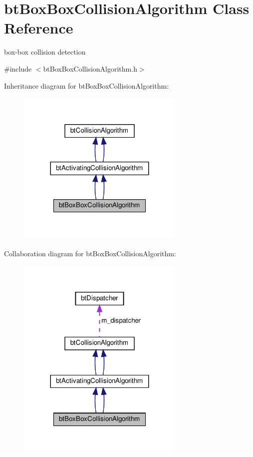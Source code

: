 \hypertarget{classbtBoxBoxCollisionAlgorithm}{}\section{bt\+Box\+Box\+Collision\+Algorithm Class Reference}
\label{classbtBoxBoxCollisionAlgorithm}


box-\/box collision detection  




{\ttfamily \#include $<$bt\+Box\+Box\+Collision\+Algorithm.\+h$>$}



Inheritance diagram for bt\+Box\+Box\+Collision\+Algorithm\+:
\nopagebreak
\begin{figure}[H]
\begin{center}
\leavevmode
\includegraphics[width=227pt]{classbtBoxBoxCollisionAlgorithm__inherit__graph}
\end{center}
\end{figure}


Collaboration diagram for bt\+Box\+Box\+Collision\+Algorithm\+:
\nopagebreak
\begin{figure}[H]
\begin{center}
\leavevmode
\includegraphics[width=227pt]{classbtBoxBoxCollisionAlgorithm__coll__graph}
\end{center}
\end{figure}
